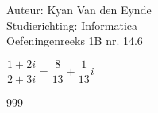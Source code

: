 \documentclass[a4paper]{article}
\begin{document}
  
\noindent \large Auteur: Kyan Van den Eynde \\
\noindent \large Studierichting: Informatica\\
\noindent \large Oefeningenreeks 1B nr. 14.6\\

\medskip

\normalsize

$\dfrac{1+2i}{2+3i} = \dfrac{8}{13} + \dfrac{1}{13}i$\\

\begin{thebibliography}{999}
\end{thebibliography}
\end{document}
